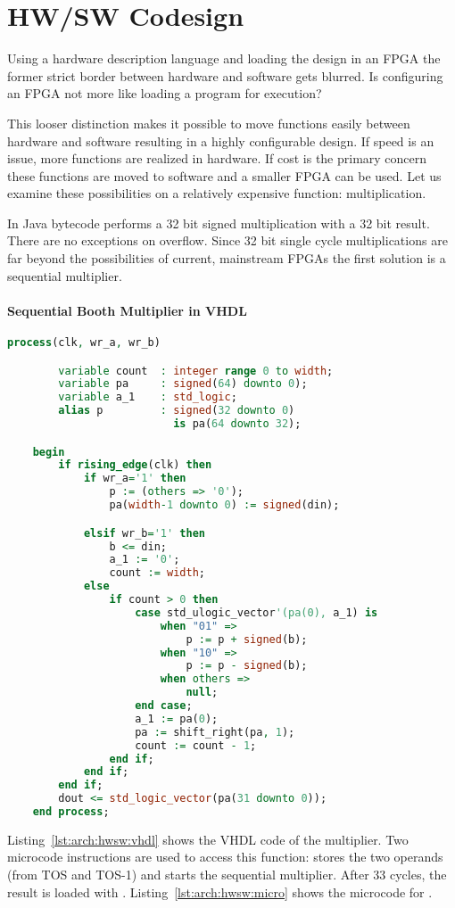 
\section{HW/SW Codesign}
\label{sec:hwsw:co}

Using a hardware description language and loading the design in an
FPGA the former strict border between hardware and software gets
blurred. Is configuring an FPGA not more like loading a program for
execution?

This looser distinction makes it possible to move functions easily
between hardware and software resulting in a highly configurable
design. If speed is an issue, more functions are realized in
hardware. If cost is the primary concern these functions are moved
to software and a smaller FPGA can be used. Let us examine these
possibilities on a relatively expensive function: multiplication.

In Java bytecode  performs a 32 bit signed multiplication
with a 32 bit result. There are no exceptions on overflow. Since 32
bit single cycle multiplications are far beyond the possibilities of
current, mainstream FPGAs the first solution is a sequential
multiplier.

\paragraph{Sequential Booth Multiplier in VHDL}

\begin{lstlisting}[float, caption={Booth multiplier in VHDL},
language=VHDL, label=lst:arch:hwsw:vhdl]
    process(clk, wr_a, wr_b)

        variable count  : integer range 0 to width;
        variable pa     : signed(64) downto 0);
        variable a_1    : std_logic;
        alias p         : signed(32 downto 0)
                          is pa(64 downto 32);

    begin
        if rising_edge(clk) then
            if wr_a='1' then
                p := (others => '0');
                pa(width-1 downto 0) := signed(din);

            elsif wr_b='1' then
                b <= din;
                a_1 := '0';
                count := width;
            else
                if count > 0 then
                    case std_ulogic_vector'(pa(0), a_1) is
                        when "01" =>
                            p := p + signed(b);
                        when "10" =>
                            p := p - signed(b);
                        when others =>
                            null;
                    end case;
                    a_1 := pa(0);
                    pa := shift_right(pa, 1);
                    count := count - 1;
                end if;
            end if;
        end if;
        dout <= std_logic_vector(pa(31 downto 0));
    end process;
\end{lstlisting}
%
Listing~\ref{lst:arch:hwsw:vhdl} shows the VHDL code of the
multiplier. Two microcode instructions are used to access this
function:  stores the two operands (from TOS and TOS-1)
and starts the sequential multiplier. After 33 cycles, the result is
loaded with . Listing~\ref{lst:arch:hwsw:micro} shows
the microcode for .

